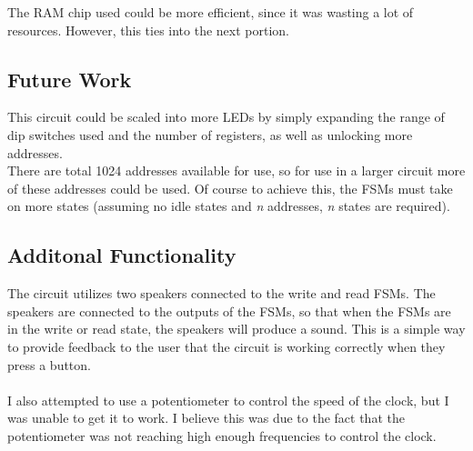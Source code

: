 \documentclass{article}
\begin{document}
        The RAM chip used could be more efficient, since it was wasting a lot of resources. However, this ties into the next portion. 

        \subsection{Future Work}

        This circuit could be scaled into more LEDs by simply expanding the range of dip switches used and the number of registers, as well as unlocking more addresses. \\
        There are total 1024 addresses available for use, so for use in a larger circuit more of these addresses could be used. Of course to achieve this, the FSMs must take on more states (assuming no idle states and \textit{n} addresses, \textit{n} states are required).\\


        \subsection{Additonal Functionality}

        The circuit utilizes two speakers connected to the write and read FSMs. The speakers are connected to the outputs of the FSMs, so that when the FSMs are in the write or read state, the speakers will produce a sound. This is a simple way to provide feedback to the user that the circuit is working correctly when they press a button.\\\\
        I also attempted to use a potentiometer to control the speed of the clock, but I was unable to get it to work. I believe this was due to the fact that the potentiometer was not reaching high enough frequencies to control the clock.\\

        
\end{document}
